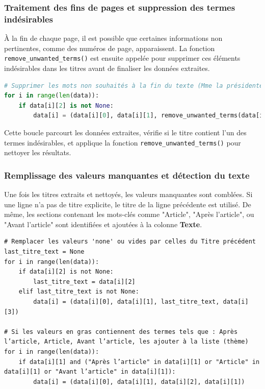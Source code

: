 \subsubsection{Traitement des fins de pages et suppression des termes indésirables}

À la fin de chaque page, il est possible que certaines informations non pertinentes, comme des numéros de page, apparaissent. La fonction \texttt{remove\_unwanted\_terms()} est ensuite appelée pour supprimer ces éléments indésirables dans les titres avant de finaliser les données extraites.

\begin{lstlisting}[language=Python]
# Supprimer les mots non souhaités à la fin du texte (Mme la présidente) du TITRE
for i in range(len(data)):
    if data[i][2] is not None:
        data[i] = (data[i][0], data[i][1], remove_unwanted_terms(data[i][2]), data[i][3])
\end{lstlisting}
Cette boucle parcourt les données extraites, vérifie si le titre contient l'un des termes indésirables, et applique la fonction \texttt{remove\_unwanted\_terms()} pour nettoyer les résultats.

\subsubsection{Remplissage des valeurs manquantes et détection du texte}

Une fois les titres extraits et nettoyés, les valeurs manquantes sont comblées. Si une ligne n'a pas de titre explicite, le titre de la ligne précédente est utilisé. De même, les sections contenant les mots-clés comme "Article", "Après l’article", ou "Avant l’article" sont identifiées et ajoutées à la colonne \textbf{Texte}.
\begin{lstlisting}
# Remplacer les valeurs 'none' ou vides par celles du Titre précédent
last_titre_text = None
for i in range(len(data)):
    if data[i][2] is not None:
        last_titre_text = data[i][2]
    elif last_titre_text is not None:
        data[i] = (data[i][0], data[i][1], last_titre_text, data[i][3])

# Si les valeurs en gras contiennent des termes tels que : Après l’article, Article, Avant l’article, les ajouter à la liste (thème)
for i in range(len(data)):
    if data[i][1] and ("Après l’article" in data[i][1] or "Article" in data[i][1] or "Avant l’article" in data[i][1]):
        data[i] = (data[i][0], data[i][1], data[i][2], data[i][1])
\end{lstlisting}

